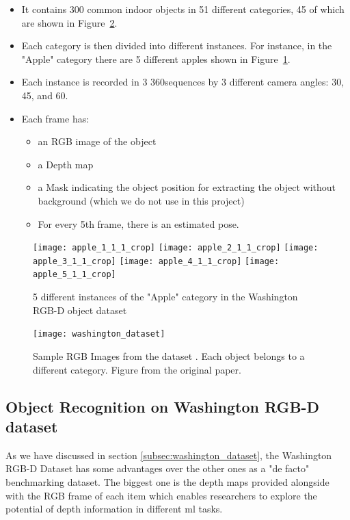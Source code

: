\begin{itemize}
	\item It contains 300 common indoor objects in 51 different categories, 45 of which
		are shown in Figure~\ref{fig:washington_dataset}.
	\item Each category is then divided into different instances. For instance, in the
		"Apple" category there are 5 different apples shown in
		Figure~\ref{fig:apple_washington}.
	\item Each instance is recorded in 3 360\degree sequences by 3 different camera
		angles: 30\degree, 45\degree, and 60\degree.
	\item Each frame has:
		\begin{itemize}
			\item an RGB image of the object
			\item a Depth map
			\item a Mask indicating the	object position for extracting the object without
				background (which we do not use in this project)
			\item For every 5th frame, there is an estimated pose.
		\end{itemize}
\end{itemize}

\begin{figure}[h]
	\centering
	\texttt{[image: apple\_1\_1\_1\_crop]}
	\texttt{[image: apple\_2\_1\_1\_crop]}
	\texttt{[image: apple\_3\_1\_1\_crop]}
	\texttt{[image: apple\_4\_1\_1\_crop]}
	\texttt{[image: apple\_5\_1\_1\_crop]}
	\caption{5 different instances of the "Apple" category in the Washington RGB-D object dataset}
	\label{fig:apple_washington}
\end{figure}

\begin{figure}[h]
	\centering
	\texttt{[image: washington\_dataset]}
	\caption{Sample RGB Images from the dataset \cite{washington_rgbd}. Each object belongs to a different
		category. Figure from the original paper. }
	\label{fig:washington_dataset}
\end{figure}

\subsection{Object Recognition on Washington RGB-D dataset}

As we have discussed in section \ref{subsec:washington_dataset}, the Washington RGB-D
Dataset has some advantages over the other ones as a "de facto" benchmarking dataset. The
biggest one is the depth maps provided alongside with the RGB frame of each item which
enables researchers to explore the potential of depth information in different
\acrshort{ml} tasks. 

